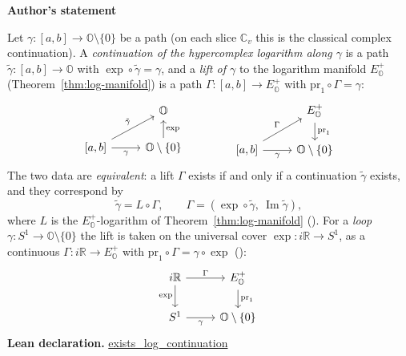 \documentclass[11pt]{article}
\newcommand{\OO}{\mathbb{O}}
\newcommand{\CC}{\mathbb{C}}
\newcommand{\RR}{\mathbb{R}}
\DeclareMathOperator{\im}{Im}
\theoremstyle{plain}
\theoremstyle{definition}
\theoremstyle{remark}
\begin{document}
\medskip
\begin{tcolorbox}[provenancecard,title={27. Theorem - The winding lift; \textbackslash{}protect\{\textbackslash{}cite[Def.\textasciitilde{}3.4, Def.\textasciitilde{}4.1, Prop.\textasciitilde{}4.2, Def.\textasciitilde{}5.11]\{GPVwind\}\}},title after break={27. Theorem - The winding lift; \textbackslash{}protect\{\textbackslash{}cite[Def.\textasciitilde{}3.4, Def.\textasciitilde{}4.1, Prop.\textasciitilde{}4.2, Def.\textasciitilde{}5.11]\{GPVwind\}\} (continued)}]
\textbf{Author's statement}\par
Let $\gamma:[a,b]\to\OO\setminus\{0\}$ be a path \textup{(}on each slice $\CC_v$ this is the
classical complex continuation\textup{)}. A \emph{continuation of the hypercomplex logarithm along
$\gamma$} is a path $\tilde\gamma:[a,b]\to\OO$ with $\exp\circ\tilde\gamma=\gamma$, and a \emph{lift
of $\gamma$} to the logarithm manifold $E^{+}_{\OO}$ \textup{(}Theorem~\ref{thm:log-manifold}\textup{)}
is a path $\Gamma:[a,b]\to E^{+}_{\OO}$ with $\mathrm{pr}_1\circ\Gamma=\gamma$:
\[
\begin{tikzcd}[row sep=1.6em, column sep=2.6em]
& \OO\\
{[a,b]} \arrow[ur,"\tilde\gamma"] \arrow[r,"\gamma"'] & \OO\setminus\{0\} \arrow[u,"\exp"']
\end{tikzcd}
\qquad\qquad
\begin{tikzcd}[row sep=1.6em, column sep=2.6em]
& E^{+}_{\OO} \arrow[d,"\mathrm{pr}_1"]\\
{[a,b]} \arrow[ur,"\Gamma"] \arrow[r,"\gamma"'] & \OO\setminus\{0\}
\end{tikzcd}
\]
The two data are \emph{equivalent}: a lift $\Gamma$ exists if and only if a continuation
$\tilde\gamma$ exists, and they correspond by
\[
\tilde\gamma=L\circ\Gamma,\qquad \Gamma=(\exp\circ\tilde\gamma,\ \im\tilde\gamma),
\]
where $L$ is the $E^{+}_{\OO}$-logarithm of Theorem~\ref{thm:log-manifold}
\textup{(}\cite[Prop.~4.2]{GPVwind}\textup{)}. For a \emph{loop} $\gamma:S^1\to\OO\setminus\{0\}$ the
lift is taken on the universal cover $\exp:i\RR\to S^1$, as a continuous $\Gamma:i\RR\to E^{+}_{\OO}$
with $\mathrm{pr}_1\circ\Gamma=\gamma\circ\exp$ \textup{(}\cite[Def.~5.11]{GPVwind}\textup{)}:
\[
\begin{tikzcd}[row sep=1.6em, column sep=2.6em]
i\RR \arrow[r,"\Gamma"] \arrow[d,"\exp"'] & E^{+}_{\OO} \arrow[d,"\mathrm{pr}_1"]\\
S^1 \arrow[r,"\gamma"'] & \OO\setminus\{0\}
\end{tikzcd}
\]
\tcblower
\textbf{Lean declaration.} \url{exists_log_continuation}

\end{tcolorbox}
\end{document}
